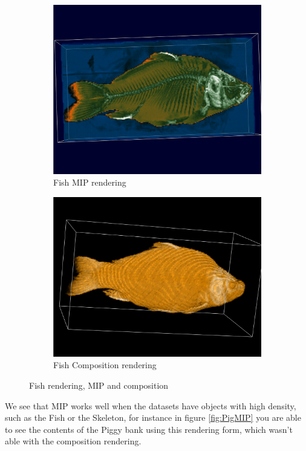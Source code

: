\documentclass[a4paper,twoside,11pt]{article}
\begin{document}
\begin{figure}[h!]
    \begin{center}
        \begin{subfigure}[b]{0.47\textwidth}
            \includegraphics[width=\textwidth]{SanderImages/visMIPZ.png}
            \caption{Fish MIP rendering}
            \label{fig:FishMIP}
        \end{subfigure}
        \begin{subfigure}[b]{0.49\textwidth}
            \includegraphics[width=\textwidth]{SanderImages/FishCompZ.png}
            \caption{Fish Composition rendering}
            \label{fig:FishComp}
        \end{subfigure}
        \caption{Fish rendering, MIP and composition}
    \end{center}
\end{figure} \newline
We see that MIP works well when the datasets have objects with high density, such as the Fish or the Skeleton, for instance in figure \ref{fig:PigMIP} you are able to see the contents of the Piggy bank using this rendering form, which wasn't able with the composition rendering.
\end{document}
